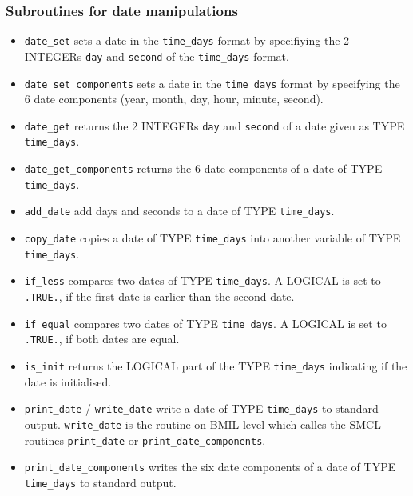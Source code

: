\documentclass[twoside]{article}
\begin{document}

\subsubsection{Subroutines for date manipulations}
%
\begin{itemize}
\item \verb|date_set| sets a date in the \verb|time_days| format by
      specifiying the 2 {\footnotesize INTEGER}s \verb|day| and \verb|second| of the
      \verb|time_days| format.
\item \verb|date_set_components| sets a date in the \verb|time_days| format by
      specifying the 6 date components (year, month, day, hour, minute,
      second).
\item \verb|date_get| returns the 2 {\footnotesize INTEGER}s \verb|day| 
       and \verb|second| of a 
      date given as {\footnotesize TYPE}  \verb|time_days|.
\item \verb|date_get_components| returns the 6 date components of a date
      of {\footnotesize TYPE} \verb|time_days|.
\item \verb|add_date| add days and seconds to a date of {\footnotesize TYPE}
      \verb|time_days|.
\item \verb|copy_date| copies a date of  {\footnotesize TYPE} \verb|time_days| 
      into another
      variable of {\footnotesize TYPE} \verb|time_days|.
\item \verb|if_less| compares two dates of {\footnotesize TYPE} \verb|time_days|.
      A {\footnotesize LOGICAL}
      is set to \verb|.TRUE.|, if the first date is earlier than the second date.
\item \verb|if_equal| compares two dates of {\footnotesize TYPE} 
      \verb|time_days|. A {\footnotesize LOGICAL}
      is set to \verb|.TRUE.|, if both dates are equal.
\item \verb|is_init| returns the {\footnotesize LOGICAL} part of the 
       {\footnotesize TYPE} \verb|time_days| indicating if the date is
       initialised.
\item \verb|print_date| / \verb|write_date| write a date of {\footnotesize TYPE}
      \verb|time_days| to standard output. \verb|write_date| is the routine on
      BMIL level which calles the SMCL routines \verb|print_date| or
      \verb|print_date_components|.
\item \verb|print_date_components| writes the six date components of a date
       of {\footnotesize TYPE} \verb|time_days| to standard output.
\end{itemize}
\end{document}
